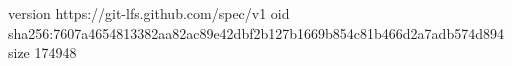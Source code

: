 version https://git-lfs.github.com/spec/v1
oid sha256:7607a4654813382aa82ac89e42dbf2b127b1669b854c81b466d2a7adb574d894
size 174948
